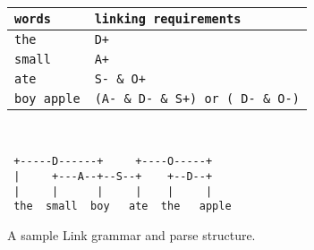 \begin{figure}[h]
\begin{center}

	\begin{tabular}{l|l}
		\texttt{words} & \texttt{linking requirements}\\
		\hline
		\texttt{the} & \verb#D+#\\
		\texttt{small} & \verb#A+#\\
		\texttt{ate} & \verb#S- & O+#\\
		\texttt{boy apple} & \verb#(A- & D- & S+) or ( D- & O-)#\\
	\end{tabular}
	\begin{verbatim}


 +-----D------+     +----O-----+   
 |     +---A--+--S--+    +--D--+      
 |     |      |     |    |     |              
 the  small  boy   ate  the   apple
\end{verbatim}
	\caption{A sample Link grammar and parse structure.}
	\label{figure:link-example}
\end{center}
\end{figure}

